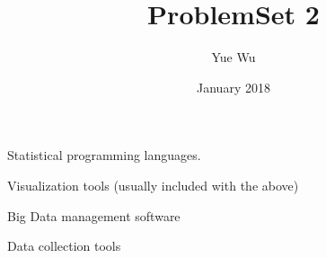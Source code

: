 \documentclass{article}
\title{ProblemSet 2}
\author{Yue Wu}
\date{January 2018}
\begin{document}
\maketitle



Statistical programming languages.

Visualization tools (usually included with the above)

Big Data management software

Data collection tools
\end{document}
